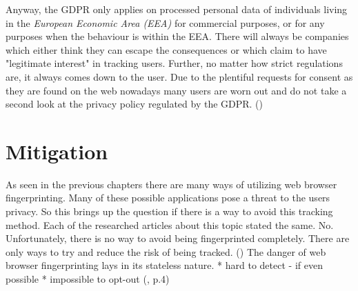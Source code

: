 Anyway, the GDPR only applies on processed personal data of individuals living in the \textit{European Economic Area (EEA)} for commercial purposes, or for any purposes when the behaviour is within the EEA. There will always be companies which either think they can escape the consequences or which claim to have "legitimate interest" in tracking users. Further, no matter how strict regulations are, it always comes down to the user. Due to the plentiful requests for consent as they are found on the web nowadays many users are worn out and do not take a second look at the privacy policy regulated by the GDPR. (\textcite{miele18})

\section{Mitigation} \label{mitigation}
As seen in the previous chapters there are many ways of utilizing web browser fingerprinting. Many of these possible applications pose a threat to the users privacy. So this brings up the question if there is a way to avoid this tracking method. Each of the researched articles about this topic stated the same. No. Unfortunately, there is no way to avoid being fingerprinted completely. There are only ways to try and reduce the risk of being tracked. (\textcite{web17})
The danger of web browser fingerprinting lays in its stateless nature. 
* hard to detect - if even possible
* impossible to opt-out
(\textcite{upi15}, p.4)
 \\\\
